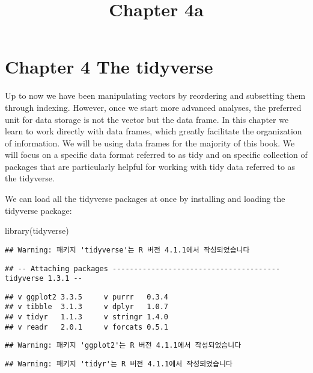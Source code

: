 \documentclass[
]{article}
\title{Chapter 4a}
\author{}
\date{\vspace{-2.5em}}
\newenvironment{Shaded}{\begin{snugshade}}{\end{snugshade}}
\newcommand{\FunctionTok}[1]{\textcolor[rgb]{0.00,0.00,0.00}{#1}}
\newcommand{\NormalTok}[1]{#1}
\begin{document}
\maketitle

\hypertarget{chapter-4-the-tidyverse}{%
\section{Chapter 4 The tidyverse}\label{chapter-4-the-tidyverse}}

Up to now we have been manipulating vectors by reordering and subsetting
them through indexing. However, once we start more advanced analyses,
the preferred unit for data storage is not the vector but the data
frame. In this chapter we learn to work directly with data frames, which
greatly facilitate the organization of information. We will be using
data frames for the majority of this book. We will focus on a specific
data format referred to as tidy and on specific collection of packages
that are particularly helpful for working with tidy data referred to as
the tidyverse.

We can load all the tidyverse packages at once by installing and loading
the tidyverse package:

\begin{Shaded}
\begin{Highlighting}[]
\FunctionTok{library}\NormalTok{(tidyverse)}
\end{Highlighting}
\end{Shaded}

\begin{verbatim}
## Warning: 패키지 'tidyverse'는 R 버전 4.1.1에서 작성되었습니다
\end{verbatim}

\begin{verbatim}
## -- Attaching packages --------------------------------------- tidyverse 1.3.1 --
\end{verbatim}

\begin{verbatim}
## v ggplot2 3.3.5     v purrr   0.3.4
## v tibble  3.1.3     v dplyr   1.0.7
## v tidyr   1.1.3     v stringr 1.4.0
## v readr   2.0.1     v forcats 0.5.1
\end{verbatim}

\begin{verbatim}
## Warning: 패키지 'ggplot2'는 R 버전 4.1.1에서 작성되었습니다
\end{verbatim}

\begin{verbatim}
## Warning: 패키지 'tidyr'는 R 버전 4.1.1에서 작성되었습니다
\end{verbatim}
\end{document}
